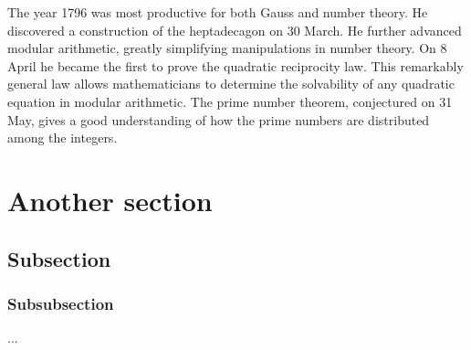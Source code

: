 The year 1796 was most productive for both Gauss and number theory. He discovered a construction of the heptadecagon on 30 March. He further advanced modular arithmetic, greatly simplifying manipulations in number theory. On 8 April he became the first to prove the quadratic reciprocity law. This remarkably general law allows mathematicians to determine the solvability of any quadratic equation in modular arithmetic. The prime number theorem, conjectured on 31 May, gives a good understanding of how the prime numbers are distributed among the integers.

\section*{Another section}

\subsection*{Subsection}

\subsubsection*{Subsubsection}
...
